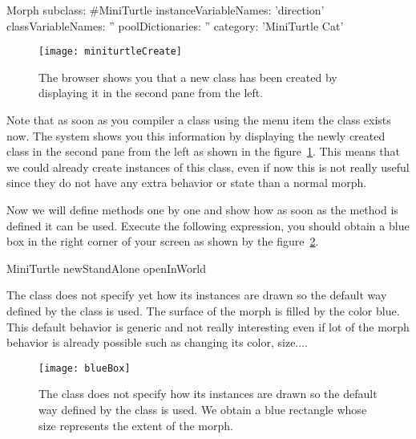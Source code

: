 \begin{classdef}\label{cls:miniturtle}
Morph subclass: \#MiniTurtle
   instanceVariableNames: 'direction'
   classVariableNames: ''
   poolDictionaries: ''
   category: 'MiniTurtle Cat'
\end{classdef}

\begin{figure}
\begin{center}
\texttt{[image: miniturtleCreate]}
\caption{The browser shows you that a new class has been created by displaying
it in the second pane from the left. \label{fig:miniturtleCreated}}
\end{center}
\end{figure}

Note that as soon as you compiler a class using the menu item
 the class exists now.  The system shows
you this information by displaying the newly created class in the
second pane from the left as shown in the
figure~\ref{fig:miniturtleCreated}.  This means that we could already
create instances of this class, even if now this is not really useful
since they do not have any extra behavior or state than a normal
morph.  

Now we will define methods one by one and show how as soon as the
method is defined it can be used. Execute the following expression,
you should obtain a blue box in the right corner of your screen as
shown by the figure~\ref{fig:blueBox}.

\begin{scriptwithouttitle}
MiniTurtle newStandAlone openInWorld
\end{scriptwithouttitle}

The class \mtc does not specify yet how its instances are drawn so the
default way defined by the class  is used. The surface of
the morph is filled by the color blue. This default behavior is
generic and not really interesting even if lot of the morph behavior
is already possible such as changing its color, size....

\begin{figure}
\begin{center}
\texttt{[image: blueBox]}
\caption{The class \mtc does not specify how its instances are 
drawn so the default way defined by the class  
is used. We obtain a blue rectangle whose size represents the extent 
of the morph.\label{fig:blueBox}}
\end{center}
\end{figure}

